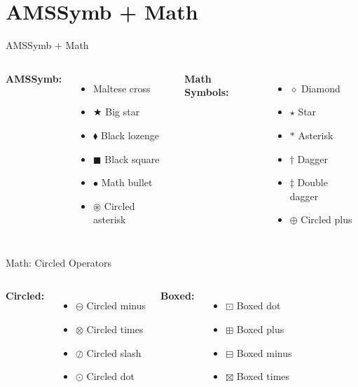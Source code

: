 \documentclass[10pt]{beamer}
\begin{document}
\section{AMSSymb + Math}

\begin{frame}{AMSSymb + Math}
\begin{columns}
\textbf{AMSSymb:}
\begin{itemize}
  \item \maltese Maltese cross
  \item $\bigstar$ Big star
  \item $\blacklozenge$ Black lozenge
  \item $\blacksquare$ Black square
  \item $\bullet$ Math bullet
  \item $\circledast$ Circled asterisk
\end{itemize}

\textbf{Math Symbols:}
\begin{itemize}
  \item $\diamond$ Diamond
  \item $\star$ Star
  \item $\ast$ Asterisk
  \item $\dagger$ Dagger
  \item $\ddagger$ Double dagger
  \item $\oplus$ Circled plus
\end{itemize}
\end{columns}
\end{frame}

\begin{frame}{Math: Circled Operators}
\begin{columns}
\textbf{Circled:}
\begin{itemize}
  \item $\ominus$ Circled minus
  \item $\otimes$ Circled times
  \item $\oslash$ Circled slash
  \item $\odot$ Circled dot
\end{itemize}

\textbf{Boxed:}
\begin{itemize}
  \item $\boxdot$ Boxed dot
  \item $\boxplus$ Boxed plus
  \item $\boxminus$ Boxed minus
  \item $\boxtimes$ Boxed times
\end{itemize}
\end{columns}
\end{frame}
\end{document}
